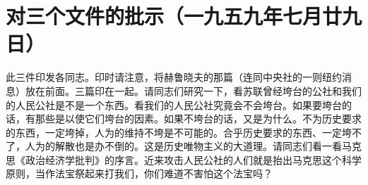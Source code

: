 \section[对三个文件的批示（一九五九年七月廿九日）]{对三个文件的批示（一九五九年七月廿九日）}


此三件印发各同志。印时请注意，将赫鲁晓夫的那篇（连同中央社的一则纽约消息）放在前面。三篇印在一起。请同志们研究一下，看苏联曾经垮台的公社和我们的人民公社是不是一个东西。看我们的人民公社究竟会不会垮台。如果要垮台的话，有那些是以使它们垮台的因素。如果不垮台的话，又是为什么。不为历史要求的东西，一定垮掉，人为的维持不垮是不可能的。合乎历史要求的东西、一定垮不了，人为的解散也是办不倒的。这是历史唯物主义的大道理。请同志们看一看马克思《政治经济学批判》的序言。近来攻击人民公社的人们就是抬出马克思这个科学原则，当作法宝祭起来打我们，你们难道不害怕这个法宝吗？


